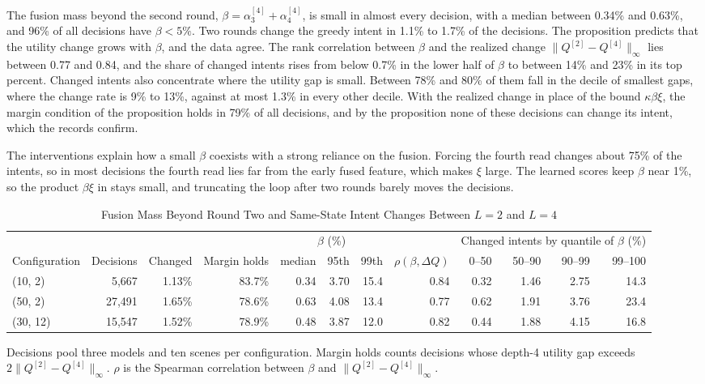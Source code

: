 The fusion mass beyond the second round, $\beta=\alpha^{[4]}_3+\alpha^{[4]}_4$, is small in almost every decision, with a median between 0.34\% and 0.63\%, and 96\% of all decisions have $\beta<5\%$. Two rounds change the greedy intent in 1.1\% to 1.7\% of the decisions. The proposition predicts that the utility change grows with $\beta$, and the data agree. The rank correlation between $\beta$ and the realized change $\|Q^{[2]}-Q^{[4]}\|_\infty$ lies between 0.77 and 0.84, and the share of changed intents rises from below 0.7\% in the lower half of $\beta$ to between 14\% and 23\% in its top percent. Changed intents also concentrate where the utility gap is small. Between 78\% and 80\% of them fall in the decile of smallest gaps, where the change rate is 9\% to 13\%, against at most 1.3\% in every other decile. With the realized change in place of the bound $\kappa\beta\xi$, the margin condition of the proposition holds in 79\% of all decisions, and by the proposition none of these decisions can change its intent, which the records confirm.

The interventions explain how a small $\beta$ coexists with a strong reliance on the fusion. Forcing the fourth read changes about 75\% of the intents, so in most decisions the fourth read lies far from the early fused feature, which makes $\xi$ large. The learned scores keep $\beta$ near 1\%, so the product $\beta\xi$ in  stays small, and truncating the loop after two rounds barely moves the decisions.

\begin{table}[!t]
\centering
\scriptsize
\setlength{\tabcolsep}{3.2pt}
\caption{Fusion Mass Beyond Round Two and Same-State Intent Changes Between $L=2$ and $L=4$}
\label{tab:s-prefix}
\begin{tabular}{@{}lrrrrrrrrrrr@{}}
\toprule
 & & & & \multicolumn{3}{c}{$\beta$ (\%)} & & \multicolumn{4}{c}{Changed intents by quantile of $\beta$ (\%)}\\
\cmidrule(lr){5-7}\cmidrule(l){9-12}
Configuration & Decisions & Changed & Margin holds & median & 95th & 99th & $\rho(\beta,\Delta Q)$ & 0--50 & 50--90 & 90--99 & 99--100\\
\midrule
(10, 2) & 5,667 & 1.13\% & 83.7\% & 0.34 & 3.70 & 15.4 & 0.84 & 0.32 & 1.46 & 2.75 & 14.3\\
(50, 2) & 27,491 & 1.65\% & 78.6\% & 0.63 & 4.08 & 13.4 & 0.77 & 0.62 & 1.91 & 3.76 & 23.4\\
(30, 12) & 15,547 & 1.52\% & 78.9\% & 0.48 & 3.87 & 12.0 & 0.82 & 0.44 & 1.88 & 4.15 & 16.8\\
\bottomrule
\end{tabular}
\par\smallskip
\parbox{\textwidth}{\scriptsize Decisions pool three models and ten scenes per configuration. Margin holds counts decisions whose depth-4 utility gap exceeds $2\|Q^{[2]}-Q^{[4]}\|_\infty$. $\rho$ is the Spearman correlation between $\beta$ and $\|Q^{[2]}-Q^{[4]}\|_\infty$.}
\end{table}


